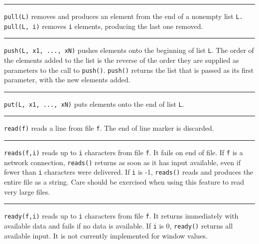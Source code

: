 \bigskip\hrule\vspace{0.1cm}

\noindent
{}\texttt{pull(L)} removes and produces an element from the
end of a nonempty list \texttt{L.} \texttt{pull(L, i)} removes
\texttt{i} elements, producing the last one removed.

\bigskip\hrule\vspace{0.1cm}

\noindent
\texttt{push(L, x1, ..., xN)} pushes elements onto the beginning of list
\texttt{L}. The order of the elements added to the list is the reverse
of the order they are supplied as parameters to the call to
\texttt{push()}. \texttt{push()} returns the list that is
passed as its first parameter, with the new elements added.

\hrule\vspace{0.1cm}

\noindent
{}\texttt{put(L, x1, ..., xN)} puts elements onto the end of
list \texttt{L}.

\bigskip\hrule\vspace{0.1cm}

\noindent
{}\texttt{read(f)} reads a line from file \texttt{f}. The
end of line marker is discarded.

\bigskip\hrule\vspace{0.1cm}

\noindent
{}\texttt{reads(f,i)} reads up to \texttt{i} characters
from file \texttt{f}. It fails on end of file. If \texttt{f} is a
network connection, \texttt{reads()} returns as soon as it has input
available, even if fewer than \texttt{i} characters were delivered. If
\texttt{i} is -1, \texttt{reads()} reads and produces the entire file
as a string. Care should be exercised when using this feature to read
very large files.

\bigskip\hrule\vspace{0.1cm}

\noindent
{}\texttt{ready(f,i)} reads up to \texttt{i} characters
from file \texttt{f}. It returns immediately with available data and
fails if no data is available. If \texttt{i} is 0, \texttt{ready()}
returns all available input. It is not currently implemented for window
values.

